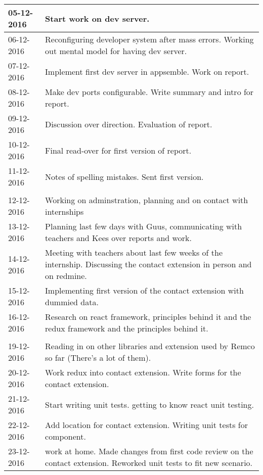 \begin{tabular}{|p{2cm}|p{11cm}|}
	\\ \hline
	
	05-12-2016 &  Start work on dev server. \\ \hline
	06-12-2016 &  Reconfiguring developer system after mass errors. Working out mental model for having dev server. \\ \hline
	07-12-2016 &  Implement first dev server in appsemble. Work on report. \\ \hline
	08-12-2016 &  Make dev ports configurable. Write summary and intro for report. \\ \hline
	09-12-2016 &  Discussion over direction. Evaluation of report. \\ \hline
	10-12-2016 &  Final read-over for first version of report. \\ \hline
	11-12-2016 &  Notes of spelling mistakes. Sent first version. \\ \hline
	\\ \hline
	
	12-12-2016 &  Working on adminstration, planning and on contact with internships \\ \hline
	13-12-2016 &  Planning last few days with Guus, communicating with teachers and Kees over reports and work. \\ \hline
	14-12-2016 &  Meeting with teachers about last few weeks of the internship. Discussing the contact extension in person and on redmine. \\ \hline
	15-12-2016 &  Implementing first version of the contact extension with dummied data. \\ \hline
	16-12-2016 &  Research on react framework, principles behind it and the redux framework and the principles behind it. \\ \hline
	
	\\ \hline
	
	19-12-2016 &  Reading in on other libraries and extension used by Remco so far (There's a lot of them). \\ \hline
	20-12-2016 &  Work redux into contact extension. Write forms for the contact extension. \\ \hline
	21-12-2016 &  Start writing unit tests. getting to know react unit testing. \\ \hline
	22-12-2016 &  Add location for contact extension. Writing unit tests for component. \\ \hline
	23-12-2016 &  work at home. Made changes from first code review on the contact extension. Reworked unit tests to fit new scenario. \\ \hline
	
\end{tabular}

